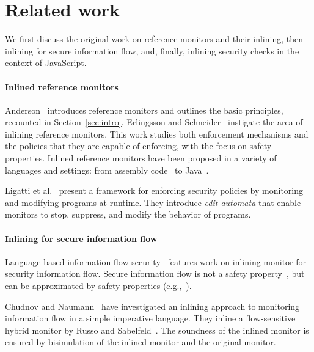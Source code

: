 \documentclass{llncs}
\begin{document}
\vspace{-.4cm} 
\section{Related work}
\label{sec:related}
\vspace{-.2cm}
We first discuss the original work on reference monitors and their
inlining, then
inlining for secure information flow, 
and, finally,
inlining security checks in the context of
JavaScript.

\vspace{-.4cm}
\paragraph{Inlined reference monitors}
Anderson~\cite{Anderson:72} introduces reference monitors and
outlines the basic principles, recounted in Section~\ref{sec:intro}.
%
Erlingsson and Schneider~\cite{DBLP:conf/nspw/ErlingssonS99,Erlingsson:PhD04} instigate
the area of inlining reference monitors. 
This work studies both enforcement mechanisms and the policies
that they are capable of enforcing, with the focus on safety properties.
Inlined reference monitors
have been proposed in a variety of languages and settings: from
assembly code~\cite{DBLP:conf/nspw/ErlingssonS99} to Java~\cite{DBLP:conf/ecoop/DamJLP09,DBLP:journals/jcs/DamJLP10,DBLP:conf/ccs/DamGL12}.

Ligatti et al.~\cite{Ligatti05editautomata:} present a 
framework for enforcing security policies
by monitoring and modifying programs at runtime. 
They introduce \emph{edit automata} that enable
monitors to stop, suppress, and modify the behavior of programs. 


\vspace{-.4cm}
\paragraph{Inlining for secure information flow}
Language-based information-flow security~\cite{Sabelfeld:Myers:JSAC}
features work on inlining monitor for security information flow.
Secure information flow is not
a safety property~\cite{McLean:SSP94}, but can be approximated by
safety properties
(e.g.,~\cite{Boudol:FAST08,Sabelfeld:Russo:PSI09,Austin:Flanagan:PLAS09}).

Chudnov and
Naumann~\cite{Chudnov:Naumann:CSF10} have investigated an inlining
approach to monitoring information flow in a simple imperative language. They inline a flow-sensitive
hybrid monitor by Russo and
Sabelfeld~\cite{Russo:Sabelfeld:CSF10}. The soundness of the inlined
monitor is ensured by bisimulation of the inlined monitor and the
original monitor.
\end{document}
